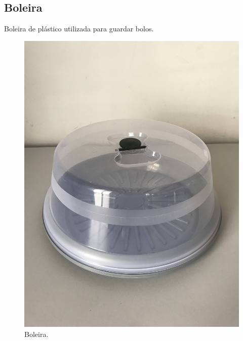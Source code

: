\documentclass[
	12pt,				%
	openright,			%
	oneside,			%
	a4paper,			%
	chapter=TITLE,		%
	english,			%
	brazil				%
	]{abntex2}
\begin{document}
\subsection{Boleira}

Boleira de plástico utilizada para guardar bolos.

\begin{multicols}{3}
\begin{figure}[H]
    \centering
    \includegraphics[scale=0.04, angle=-90]{imagens/IMG_0597.jpg}
    \caption{Boleira.}
    \label{fig:boleira}
\end{figure}   


\end{multicols}
\end{document}
